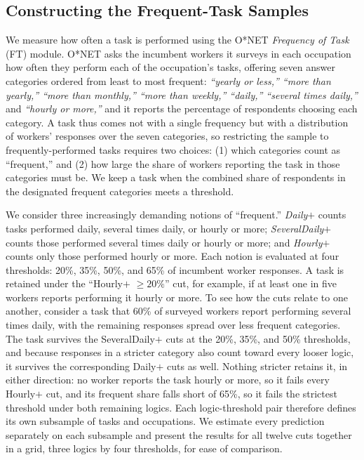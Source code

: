 \subsection{Constructing the Frequent-Task Samples}
\label{app:frequency_robustness_construction}

We measure how often a task is performed using the O*NET \emph{Frequency of Task} (FT) module.
O*NET asks the incumbent workers it surveys in each occupation how often they perform each of the occupation's tasks, offering seven answer categories ordered from least to most frequent: \textit{``yearly or less,'' ``more than yearly,'' ``more than monthly,'' ``more than weekly,'' ``daily,'' ``several times daily,''} and \textit{``hourly or more,''} and it reports the percentage of respondents choosing each category.
A task thus comes not with a single frequency but with a distribution of workers' responses over the seven categories, so restricting the sample to frequently-performed tasks requires two choices: (1) which categories count as ``frequent,'' and (2) how large the share of workers reporting the task in those categories must be.
We keep a task when the combined share of respondents in the designated frequent categories meets a threshold.

We consider three increasingly demanding notions of ``frequent.''
\emph{Daily$+$} counts tasks performed daily, several times daily, or hourly or more; \emph{SeveralDaily$+$} counts those performed several times daily or hourly or more; and \emph{Hourly$+$} counts only those performed hourly or more.
Each notion is evaluated at four thresholds: 20\%, 35\%, 50\%, and 65\% of incumbent worker responses.
A task is retained under the ``Hourly$+$ $\geq 20\%$'' cut, for example, if at least one in five workers reports performing it hourly or more.
To see how the cuts relate to one another, consider a task that 60\% of surveyed workers report performing several times daily, with the remaining responses spread over less frequent categories.
The task survives the SeveralDaily$+$ cuts at the 20\%, 35\%, and 50\% thresholds, and because responses in a stricter category also count toward every looser logic, it survives the corresponding Daily$+$ cuts as well.
Nothing stricter retains it, in either direction: no worker reports the task hourly or more, so it fails every Hourly$+$ cut, and its frequent share falls short of 65\%, so it fails the strictest threshold under both remaining logics.
Each logic-threshold pair therefore defines its own subsample of tasks and occupations.
We estimate every prediction separately on each subsample and present the results for all twelve cuts together in a grid, three logics by four thresholds, for ease of comparison.

